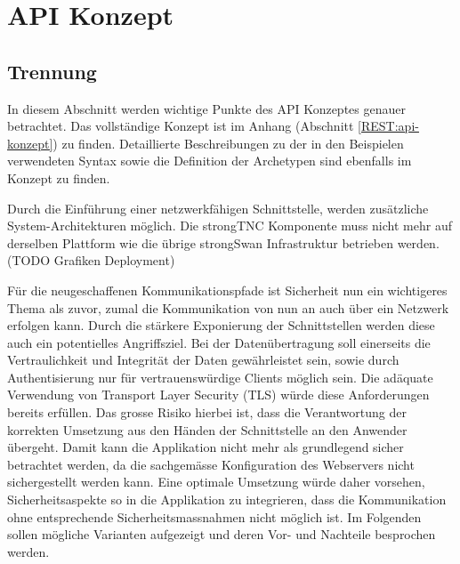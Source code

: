 \chapter{API Konzept}
\section{Trennung}
In diesem Abschnitt werden wichtige Punkte des API Konzeptes genauer betrachtet.
Das vollständige Konzept ist im Anhang (Abschnitt \ref{REST:api-konzept}) zu
finden. Detaillierte Beschreibungen zu der in den Beispielen verwendeten Syntax
sowie die Definition der Archetypen sind ebenfalls im Konzept zu finden.

Durch die Einführung einer netzwerkfähigen Schnittstelle, werden zusätzliche System-Architekturen möglich. Die strongTNC Komponente muss nicht mehr auf derselben Plattform wie die übrige strongSwan Infrastruktur betrieben werden. 
(TODO Grafiken Deployment)

Für die neugeschaffenen Kommunikationspfade ist Sicherheit nun ein wichtigeres Thema als zuvor, zumal die Kommunikation von nun an auch über ein Netzwerk erfolgen kann. Durch die stärkere Exponierung der Schnittstellen werden diese auch ein potentielles Angriffsziel.
Bei der Datenübertragung soll einerseits die Vertraulichkeit und Integrität der Daten gewährleistet sein, sowie durch Authentisierung nur für vertrauenswürdige Clients möglich sein. Die adäquate Verwendung von Transport Layer Security (TLS) würde diese Anforderungen bereits erfüllen. Das grosse Risiko hierbei ist, dass die Verantwortung der korrekten Umsetzung aus den Händen der Schnittstelle an den Anwender übergeht. Damit kann die Applikation nicht mehr als grundlegend sicher betrachtet werden, da die sachgemässe Konfiguration des Webservers nicht sichergestellt werden kann. Eine optimale Umsetzung würde daher vorsehen, Sicherheitsaspekte so in die Applikation zu integrieren, dass die Kommunikation ohne entsprechende Sicherheitsmassnahmen nicht möglich ist. Im Folgenden sollen mögliche Varianten aufgezeigt und deren Vor- und Nachteile besprochen werden.

